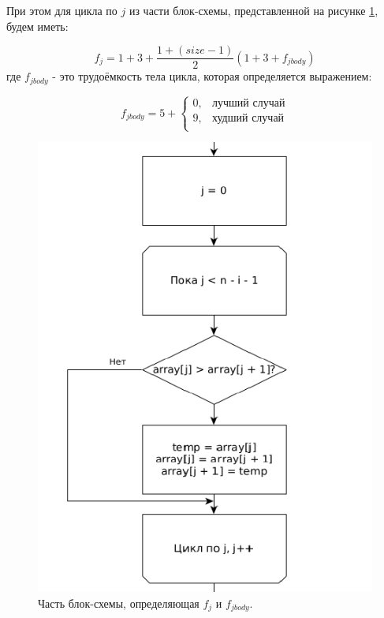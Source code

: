 \documentclass[12pt]{report}
\begin{document}
При этом для цикла по $j$ из части блок-схемы, представленной на рисунке \ref{img:bubble:fj}, будем иметь:

\begin{equation}
f_{j} = 1 + 3 + \frac{1 + (size-1)}{2}(1 + 3 + f_{jbody})
\end{equation}
где $f_{jbody}$ - это трудоёмкость тела цикла, которая определяется выражением:

\begin{equation}
f_{jbody} = 5 + \begin{cases}
				0, & \textbf{лучший случай}\\
				9, & \textbf{худший случай}\\
				\end{cases}
\end{equation}

\begin{figure}
\begin{center}
\includegraphics[scale=0.4]{inc/img/bubblefj.png}
\captionsetup{justification=centering}
	\caption{Часть блок-схемы, определяющая $f_{j}$ и $f_{j body}$.}
	\label{img:bubble:fj}	
\end{center}
\end{figure}
\end{document}
